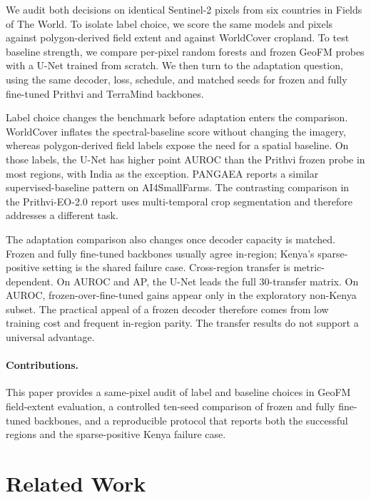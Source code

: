 \documentclass{article}
\begin{document}
We audit both decisions on identical Sentinel-2 pixels from six countries in Fields of
The World. To isolate label choice, we score the same models and pixels against polygon-derived
field extent and against WorldCover cropland. To test baseline strength, we compare
per-pixel random forests and frozen GeoFM probes with a U-Net trained from scratch. We then
turn to the adaptation question, using the same decoder, loss, schedule, and matched seeds
for frozen and fully fine-tuned Prithvi and TerraMind backbones.

Label choice changes the benchmark before adaptation enters the comparison. WorldCover
inflates the spectral-baseline score without changing the imagery, whereas polygon-derived
field labels expose the need for a spatial baseline. On those labels, the U-Net has higher
point AUROC than the Prithvi frozen probe in most regions, with India as the exception. PANGAEA
\citep{pangaea} reports a similar supervised-baseline pattern on AI4SmallFarms. The
contrasting comparison in the Prithvi-EO-2.0 report uses multi-temporal crop segmentation
\citep{prithvi} and therefore addresses a different task.

The adaptation comparison also changes once decoder capacity is matched. Frozen and fully
fine-tuned backbones usually agree in-region; Kenya's sparse-positive setting is the shared
failure case. Cross-region transfer is metric-dependent. On AUROC and AP, the U-Net leads
the full 30-transfer matrix. On AUROC, frozen-over-fine-tuned gains appear only in the
exploratory non-Kenya subset. The practical
appeal of a frozen decoder therefore comes from low training cost and frequent in-region
parity. The transfer results do not support a universal advantage.

\paragraph{Contributions.} This paper provides a same-pixel audit of label and baseline
choices in GeoFM field-extent evaluation, a controlled ten-seed comparison of frozen and
fully fine-tuned backbones, and a reproducible protocol that reports both the successful
regions and the sparse-positive Kenya failure case.

\FloatBarrier
\section{Related Work}
\label{sec:related}
\end{document}
